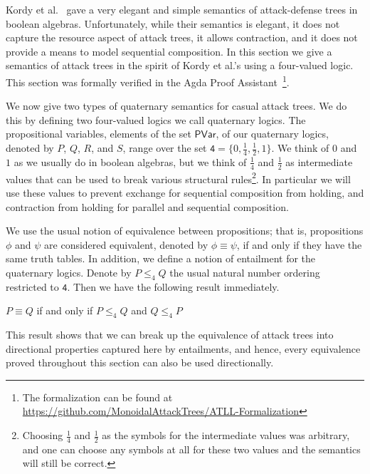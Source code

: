 \newcommand{\forth}{\frac{1}{4}}
\newcommand{\half}{\frac{1}{2}}

Kordy et al.~\cite{Kordy:2012} gave a very elegant and simple
semantics of attack-defense trees in boolean algebras.  Unfortunately,
while their semantics is elegant, it does not capture the resource
aspect of attack trees, it allows contraction, and it does not provide
a means to model sequential composition.  In this section we give a
semantics of attack trees in the spirit of Kordy et al.'s using a
four-valued logic.  This section was formally verified in the Agda
Proof Assistant~\cite{Norell:2009}\footnote{The formalization can be
  found at
  \url{https://github.com/MonoidalAttackTrees/ATLL-Formalization}}.

 We now give two types of quaternary semantics for casual attack
 trees.  We do this by defining two four-valued logics we call
 quaternary logics.  The propositional variables, elements of the set
 $\mathsf{PVar}$, of our quaternary logics, denoted by $P$, $Q$, $R$,
 and $S$, range over the set $\mathsf{4} = \{0, \forth, \half, 1\}$.
 We think of $0$ and $1$ as we usually do in boolean algebras, but we
 think of $\forth$ and $\half$ as intermediate values that can be used
 to break various structural rules\footnote{Choosing $\forth$ and
   $\half$ as the symbols for the intermediate values was arbitrary,
   and one can choose any symbols at all for these two values and the
   semantics will still be correct.}.  In particular we will use these
 values to prevent exchange for sequential composition from holding,
 and contraction from holding for parallel and sequential composition.

We use the usual notion of equivalence between propositions; that is,
propositions $\phi$ and $\psi$ are considered equivalent, denoted by
$\phi \equiv \psi$, if and only if they have the same truth tables.
In addition, we define a notion of entailment for the quaternary
logics.  Denote by $P \leq_4 Q$ the usual natural number ordering
restricted to $\mathsf{4}$.  Then we have the following result
immediately.
\begin{lemma}
  \label{lemma:entailment_in_the_quaternary_semantics}
  $P \equiv Q$ if and only if $P \leq_4 Q$ and $Q \leq_4 P$
\end{lemma}
This result shows that we can break up the equivalence of attack trees
into directional properties captured here by entailments, and hence,
every equivalence proved throughout this section can also be used
directionally.

